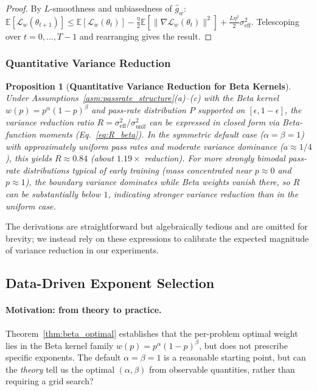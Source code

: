 \documentclass{article}
\newtheorem{proposition}[theorem]{Proposition}
\begin{document}
\begin{proof}
By $L$-smoothness and unbiasedness of $\hat{g}_w$: $\mathbb{E}[\mathcal{L}_w(\theta_{t+1})] \leq \mathbb{E}[\mathcal{L}_w(\theta_t)] - \frac{\eta}{2}\mathbb{E}[\|\nabla \mathcal{L}_w(\theta_t)\|^2] + \frac{L\eta^2}{2}\sigma_{\text{eff}}^2$. Telescoping over $t = 0, \dots, T{-}1$ and rearranging gives the result.
\end{proof}

\subsubsection{Quantitative Variance Reduction}
\label{app:quantitative_var}

\begin{proposition}[\textbf{Quantitative Variance Reduction for Beta Kernels}]
\label{prop:quantitative_var}
Under Assumptions~\ref{asm:passrate_structure}(a)--(c) with the Beta kernel $w(p) = p^{\alpha}(1-p)^{\beta}$ and pass-rate distribution $P$ supported on $[\epsilon, 1-\epsilon]$, the variance reduction ratio $R = \sigma_{\text{eff}}^2/\sigma_{\text{unif}}^2$ can be expressed in closed form via Beta-function moments (Eq.~\eqref{eq:R_beta}). In the symmetric default case ($\alpha = \beta = 1$) with approximately uniform pass rates and moderate variance dominance ($a \approx 1/4$), this yields $R \approx 0.84$ (about $1.19\times$ reduction). For more strongly bimodal pass-rate distributions typical of early training (mass concentrated near $p \approx 0$ and $p \approx 1$), the boundary variance dominates while Beta weights vanish there, so $R$ can be substantially below $1$, indicating stronger variance reduction than in the uniform case.
\end{proposition}

The derivations are straightforward but algebraically tedious and are omitted for brevity; we instead rely on these expressions to calibrate the expected magnitude of variance reduction in our experiments.

\subsection{Data-Driven Exponent Selection}
\label{app:proof_exponent}

\paragraph{Motivation: from theory to practice.}
Theorem~\ref{thm:beta_optimal} establishes that the per-problem optimal weight lies in the Beta kernel family $w(p) = p^\alpha(1-p)^\beta$, but does not prescribe specific exponents. The default $\alpha = \beta = 1$ is a reasonable starting point, but can the \emph{theory} tell us the optimal $(\alpha, \beta)$ from observable quantities, rather than requiring a grid search?
\end{document}
